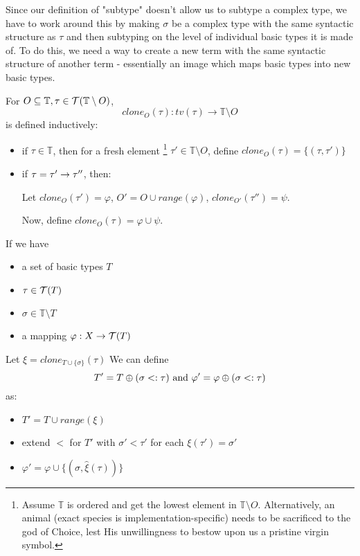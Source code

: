 \documentclass[main.tex]{subfiles}
\begin{document}
Since our definition of "subtype" doesn't allow us to subtype a complex type,
we have to work around this by making $\sigma$ be a complex type with the same
syntactic structure as $\tau$ and then subtyping on the level of individual
basic types it is made of. To do this, we need a way to create a new term
with the same syntactic structure of another term - essentially an image which
maps basic types into new basic types.

\begin{defn}
    For $O \subseteq \mathbb{T}, \tau \in \mathcal{T}( \mathbb{T} \setminus O )$,
    \[ clone_O(\tau) : tv(\tau) \rightarrow \mathbb{T} \setminus O \]
    is defined inductively:
    \begin{itemize}
        \item if $\tau \in \mathbb{T}$, then for a fresh element
            \footnote{Assume $\mathbb{T}$ is ordered and get the lowest element
            in $\mathbb{T} \setminus O$. Alternatively, an animal (exact species is
            implementation-specific) needs to be sacrificed to the god of
            Choice, lest His unwillingness to bestow upon us a pristine virgin
            symbol.}
            $\tau' \in \mathbb{T} \setminus O$, define
            $clone_O(\tau) = \{ (\tau, \tau') \}$
        \item if $\tau = \tau' \rightarrow \tau''$, then:

            Let $clone_O(\tau') = \varphi$, $O' = O \cup range(\varphi)$,
            $clone_{O'}(\tau'') = \psi$.

            Now, define $clone_O(\tau) = \varphi \cup \psi$.
    \end{itemize}
\end{defn}

\begin{defn}
    If we have
    \begin{itemize}
        \item a set of basic types $T$
        \item $\tau \in \mathcal{T}( T )$
        \item $\sigma \in \mathbb{T} \setminus T$
        \item a mapping $\varphi: X \rightarrow \mathcal{T}( T )$
    \end{itemize}
    Let $\xi = clone_{T \cup \{ \sigma \}}(\tau)$
    We can define \[ T' = T \oplus (\sigma <: \tau) \text{ and }
                     \varphi' = \varphi \oplus (\sigma <: \tau) \] as:
    \begin{itemize}
        \item $T' = T \cup range(\xi)$
        \item extend $\less$ for $T'$ with $\sigma' \less \tau'$ for each
            $\xi(\tau') = \sigma'$
        \item $\varphi' = \varphi \cup \{ (\sigma, \hat{\xi}(\tau)) \}$
    \end{itemize}
\end{defn}
\end{document}
